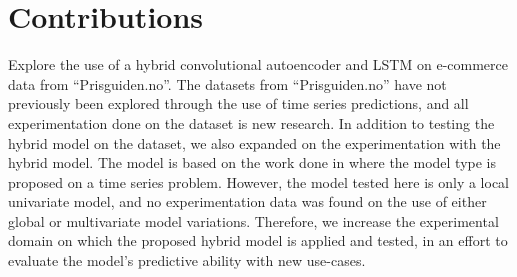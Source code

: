 
\section{Contributions}
\label{section:Discussion:Contributions}

Explore the use of a hybrid convolutional autoencoder and LSTM on e-commerce data from ``Prisguiden.no''.
The datasets from ``Prisguiden.no'' have not previously been explored through the use of time series predictions,
and all experimentation done on the dataset is new research.
In addition to testing the hybrid model on the dataset,
we also expanded on the experimentation with the hybrid model.
The model is based on the work done in \cite{Zhao2019} where the model type is proposed on a time series problem.
However, the model tested here is only a local univariate model, and no experimentation data was found
on the use of either global or multivariate model variations.
Therefore, we increase the experimental domain on which the proposed hybrid model is applied and tested,
in an effort to evaluate the model's predictive ability with new use-cases.

